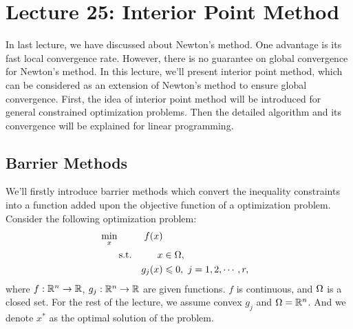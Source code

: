 \section{Lecture 25: Interior Point Method}
In last lecture, we have discussed about Newton's method. One advantage is its fast local convergence rate. However, there is no guarantee on global convergence for Newton's method. In this lecture, we'll present interior point method, which can be considered as an extension of Newton's method to ensure global convergence. First, the idea of interior point method will be introduced for general constrained optimization problems. Then the detailed algorithm and its convergence will be explained for linear programming. 
\subsection{Barrier Methods}
We'll firstly introduce barrier methods which convert the inequality constraints into a function added upon the objective function of a optimization problem. Consider the following optimization problem: 
\begin{equation}
\begin{aligned}
&\min_x & {f(x)}\\
&\qquad\text{s.t.} &x&\in{\Omega},\\
& &g_j(x)&\leqslant{0},\ j=1,2,\cdots,r,\\
\end{aligned}
\end{equation}
where $f:\mathbb{R}^n\rightarrow\mathbb{R}$, $g_j:\mathbb{R}^n\rightarrow\mathbb{R}$ are given functions. $f$ is continuous, and $\Omega$ is a closed set. For the rest of the lecture, we assume convex $g_j$ and $\Omega=\mathbb{R}^n$. And we denote $x^*$ as the optimal solution of the problem.

